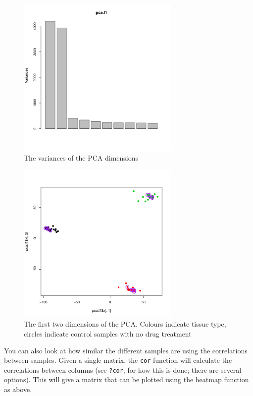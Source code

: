 \documentclass[11pt]{article}
\begin{document}
\begin{figure}[ht]
  \includegraphics[width=0.7\textwidth]{images/pca_variances.pdf}
  \caption{The variances of the PCA dimensions}
  \label{pcaVar}
\end{figure}

\begin{figure}[ht]
  \includegraphics[width=0.7\textwidth]{images/pca_dim_1_2.pdf}
  \caption{The first two dimensions of the PCA. Colours indicate tissue type,
    circles indicate control samples with no drug treatment}
  \label{pca12}
\end{figure}

You can also look at how similar the different samples are using the correlations
between samples. Given a single matrix, the \texttt{cor} function will calculate
the correlations between columns (see \texttt{?cor}, for how this is done; there
are several options). This will give a matrix that can be plotted using the
heatmap function as above.
\end{document}
